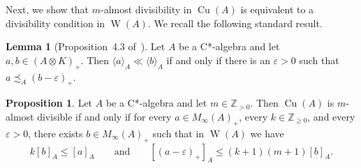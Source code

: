 \documentclass[10pt]{amsart}
\numberwithin{equation}{section}
\theoremstyle{definition}
\newtheorem{lem}[thm]{Lemma}
\newtheorem{prp}[thm]{Proposition}
\newcommand{\ep}{\varepsilon}
\newcommand{\N}{{\mathbb{Z}}_{> 0}}
\newcommand{\Nz}{{\mathbb{Z}}_{\geq 0}}
\newcommand{\Cu}{{\operatorname{Cu}}}
\newcommand{\W}{{\operatorname{W}}}
\newcommand{\andeqn}{\qquad {\mbox{and}} \qquad}
\newcommand{\ifo}{if and only if}
\newcommand{\ca}{C*-algebra}
\newcommand{\cc}[1]{\langle #1 \rangle}
\begin{document}
Next, we show that $m$-almost divisibility in $\Cu (A)$
is equivalent to a divisibility condition in $\W (A)$.
We recall the following standard result.

\begin{lem}[Proposition~4.3 of~\cite{gardella}]\label{L_5Z28_CptCont}
Let $A$ be a \ca{} and let $a, b \in (A \otimes K)_{+}$.
Then $\cc{a}_A \ll \cc{b}_A$ \ifo{} there is an $\ep > 0$ such
that $a \precsim_A (b - \ep)_{+}$.
\end{lem}

\begin{prp}\label{P_6324_WDiv}
Let $A$ be a \ca{} and let $m \in \N$.
Then $\Cu (A)$ is $m$-almost divisible if and only if
for every $a \in M_{\infty} (A)_+$, every $k \in \Nz$, and every $\ep > 0$,
there exists $b \in M_{\infty} (A)_+$ such that in $\W (A)$ we have
\[
k [b]_A \leq [a]_A
\andeqn
[(a - \ep)_+]_A \leq (k + 1) (m + 1) [b]_A.
\]
\end{prp}
\end{document}
